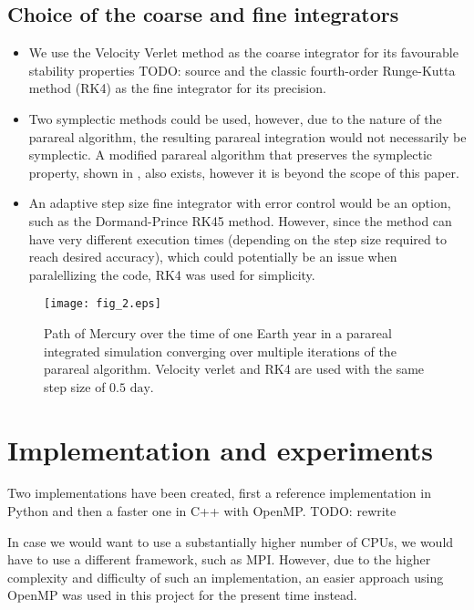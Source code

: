 \documentclass[conference]{IEEEtran}
\begin{document}
\subsection{Choice of the coarse and fine integrators}
\begin{itemize}
    \item We use the Velocity Verlet method as the coarse integrator for its favourable stability properties {\color{red} TODO: source} and the classic fourth-order Runge-Kutta method (RK4) as the fine integrator for its precision. 
    \item Two symplectic methods could be used, however, due to the nature of the parareal algorithm, the resulting parareal integration would not necessarily be symplectic. A modified parareal algorithm that preserves the symplectic property, shown in \cite{symplecticparareal}, also exists, however it is beyond the scope of this paper.
    \item An adaptive step size fine integrator with error control would be an option, such as the Dormand-Prince RK45 method. However, since the method can have very different execution times (depending on the step size required to reach desired accuracy), which could potentially be an issue when paralellizing the code, RK4 was used for simplicity.
\end{itemize}

\begin{figure}[htbp]
\centerline{\texttt{[image: fig\_2.eps]}}
\caption{Path of Mercury over the time of one Earth year in a parareal integrated simulation converging over multiple iterations of the parareal algorithm. Velocity verlet and RK4 are used with the same step size of $0.5\text{ day}$.}
\label{mercury}
\end{figure}

\section{Implementation and experiments}
Two implementations have been created, first a reference implementation in Python and then a faster one in C++ with OpenMP. {\color{red} TODO: rewrite}

In case we would want to use a substantially higher number of CPUs, we would have to use a different framework, such as MPI. However, due to the higher complexity and difficulty of such an implementation, an easier approach using OpenMP was used in this project for the present time instead.
\end{document}
